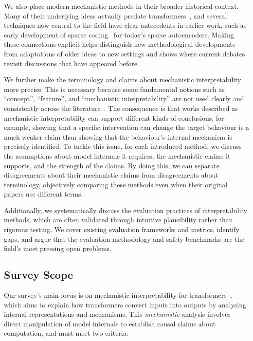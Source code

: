 We also place modern mechanistic methods in their broader historical context. Many of their underlying ideas actually predate transformers~, and several techniques now central to the field have clear antecedents in earlier work, such as early development of sparse coding~ for today's sparse autoencoders. Making these connections explicit helps distinguish new methodological developments from adaptations of older ideas to new settings and shows where current debates revisit discussions that have appeared before.

We further make the terminology and claims about mechanistic interpretability more precise. This is necessary because some fundamental notions such as ``concept'', ``feature'', and ``mechanistic interpretability'' are not used clearly and consistently across the literature~. The consequence is that works described as mechanistic interpretability can support different kinds of conclusions; for example, showing that a specific intervention can change the target behaviour is a much weaker claim than showing that the behaviour's internal mechanism is precisely identified. To tackle this issue, for each introduced method, we discuss the assumptions about model internals it requires, the mechanistic claims it supports, and the strength of the claims. By doing this, we can separate disagreements about their mechanistic claims from disagreements about terminology, objectively comparing these methods even when their original papers use different terms.


Additionally, we systematically discuss the evaluation practices of interpretability methods, which are often validated through intuitive plausibility rather than rigorous testing. We cover existing evaluation frameworks and metrics, identify gaps, and argue that the evaluation methodology and safety benchmarks are the field's most pressing open problems.

\subsection{Survey Scope}
\label{sec:scope}




Our survey's main focus is on mechanistic interpretability for transformers~, which aims to explain how transformers convert inputs into outputs by analysing internal representations and mechanisms. This \textit{mechanistic} analysis involves direct manipulation of model internals to establish causal claims about computation, and must meet two criteria:

